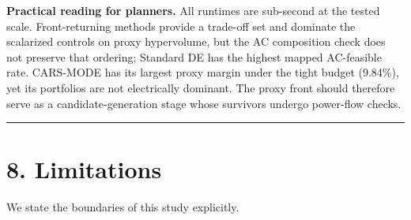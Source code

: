 \documentclass[
  10pt,
  a4paper,
]{article}
\begin{document}
\textbf{Practical reading for planners.} All runtimes are sub-second at
the tested scale. Front-returning methods provide a trade-off set and
dominate the scalarized controls on proxy hypervolume, but the AC
composition check does not preserve that ordering; Standard DE has the
highest mapped AC-feasible rate. CARS-MODE has its largest proxy margin
under the tight budget (9.84\%), yet its portfolios are not electrically
dominant. The proxy front should therefore serve as a
candidate-generation stage whose survivors undergo power-flow checks.

\begin{center}\rule{0.5\linewidth}{0.5pt}\end{center}

\section{8. Limitations}\label{limitations}

We state the boundaries of this study explicitly.
\end{document}
